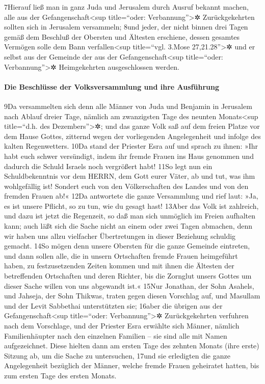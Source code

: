 7Hierauf ließ man in ganz Juda und Jerusalem durch Ausruf bekannt
machen, alle aus der Gefangenschaft\textless sup title=``oder:
Verbannung''\textgreater✲ Zurückgekehrten sollten sich in Jerusalem
versammeln; 8und jeder, der nicht binnen drei Tagen gemäß dem Beschluß
der Obersten und Ältesten erschiene, dessen gesamtes Vermögen solle dem
Bann verfallen\textless sup title=``vgl. 3.Mose 27,21.28''\textgreater✲
und er selbst aus der Gemeinde der aus der Gefangenschaft\textless sup
title=``oder: Verbannung''\textgreater✲ Heimgekehrten ausgeschlossen
werden.

\hypertarget{die-beschluxfcsse-der-volksversammlung-und-ihre-ausfuxfchrung}{%
\paragraph{Die Beschlüsse der Volksversammlung und ihre
Ausführung}\label{die-beschluxfcsse-der-volksversammlung-und-ihre-ausfuxfchrung}}

9Da versammelten sich denn alle Männer von Juda und Benjamin in
Jerusalem nach Ablauf dreier Tage, nämlich am zwanzigsten Tage des
neunten Monats\textless sup title=``d.h. des Dezembers''\textgreater✲;
und das ganze Volk saß auf dem freien Platze vor dem Hause Gottes,
zitternd wegen der vorliegenden Angelegenheit und infolge des kalten
Regenwetters. 10Da stand der Priester Esra auf und sprach zu ihnen: »Ihr
habt euch schwer versündigt, indem ihr fremde Frauen ins Haus genommen
und dadurch die Schuld Israels noch vergrößert habt! 11So legt nun ein
Schuldbekenntnis vor dem HERRN, dem Gott eurer Väter, ab und tut, was
ihm wohlgefällig ist! Sondert euch von den Völkerschaften des Landes und
von den fremden Frauen ab!« 12Da antwortete die ganze Versammlung und
rief laut: »Ja, es ist unsere Pflicht, so zu tun, wie du gesagt hast!
13Aber das Volk ist zahlreich, und dazu ist jetzt die Regenzeit, so daß
man sich unmöglich im Freien aufhalten kann; auch läßt sich die Sache
nicht an einem oder zwei Tagen abmachen, denn wir haben uns allzu
vielfacher Übertretungen in dieser Beziehung schuldig gemacht. 14So
mögen denn unsere Obersten für die ganze Gemeinde eintreten, und dann
sollen alle, die in unsern Ortschaften fremde Frauen heimgeführt haben,
zu festzusetzenden Zeiten kommen und mit ihnen die Ältesten der
betreffenden Ortschaften und deren Richter, bis die Zornglut unsers
Gottes um dieser Sache willen von uns abgewandt ist.« 15Nur Jonathan,
der Sohn Asahels, und Jahseja, der Sohn Thikwas, traten gegen diesen
Vorschlag auf, und Masullam und der Levit Sabbethai unterstützten sie;
16aber die übrigen aus der Gefangenschaft\textless sup title=``oder:
Verbannung''\textgreater✲ Zurückgekehrten verfuhren nach dem Vorschlage,
und der Priester Esra erwählte sich Männer, nämlich Familienhäupter nach
den einzelnen Familien -- sie sind alle mit Namen aufgezeichnet. Diese
hielten dann am ersten Tage des zehnten Monats (ihre erste) Sitzung ab,
um die Sache zu untersuchen, 17und sie erledigten die ganze
Angelegenheit bezüglich der Männer, welche fremde Frauen geheiratet
hatten, bis zum ersten Tage des ersten Monats.

